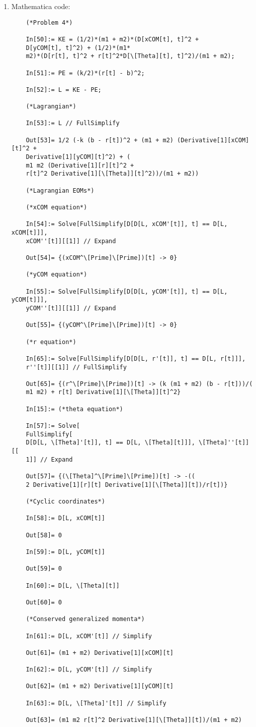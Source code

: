 \documentclass{article}
\theoremstyle{definition}
\begin{document}
\begin{enumerate}[label = (\alph*)]
	\item Mathematica code:
	\begin{lstlisting}
	(*Problem 4*)
	
	In[50]:= KE = (1/2)*(m1 + m2)*(D[xCOM[t], t]^2 + 
	D[yCOM[t], t]^2) + (1/2)*(m1*
	m2)*(D[r[t], t]^2 + r[t]^2*D[\[Theta][t], t]^2)/(m1 + m2);
	
	In[51]:= PE = (k/2)*(r[t] - b)^2;
	
	In[52]:= L = KE - PE;
	
	(*Lagrangian*)
	
	In[53]:= L // FullSimplify
	
	Out[53]= 1/2 (-k (b - r[t])^2 + (m1 + m2) (Derivative[1][xCOM][t]^2 + 
	Derivative[1][yCOM][t]^2) + (
	m1 m2 (Derivative[1][r][t]^2 + 
	r[t]^2 Derivative[1][\[Theta]][t]^2))/(m1 + m2))
	
	(*Lagrangian EOMs*)
	
	(*xCOM equation*)
	
	In[54]:= Solve[FullSimplify[D[D[L, xCOM'[t]], t] == D[L, xCOM[t]]], 
	xCOM''[t]][[1]] // Expand
	
	Out[54]= {(xCOM^\[Prime]\[Prime])[t] -> 0}
	
	(*yCOM equation*)
	
	In[55]:= Solve[FullSimplify[D[D[L, yCOM'[t]], t] == D[L, yCOM[t]]], 
	yCOM''[t]][[1]] // Expand
	
	Out[55]= {(yCOM^\[Prime]\[Prime])[t] -> 0}
	
	(*r equation*)
	
	In[65]:= Solve[FullSimplify[D[D[L, r'[t]], t] == D[L, r[t]]], 
	r''[t]][[1]] // FullSimplify
	
	Out[65]= {(r^\[Prime]\[Prime])[t] -> (k (m1 + m2) (b - r[t]))/(
	m1 m2) + r[t] Derivative[1][\[Theta]][t]^2}
	
	In[15]:= (*theta equation*)
	
	In[57]:= Solve[
	FullSimplify[
	D[D[L, \[Theta]'[t]], t] == D[L, \[Theta][t]]], \[Theta]''[t]][[
	1]] // Expand
	
	Out[57]= {(\[Theta]^\[Prime]\[Prime])[t] -> -((
	2 Derivative[1][r][t] Derivative[1][\[Theta]][t])/r[t])}
	
	(*Cyclic coordinates*)
	
	In[58]:= D[L, xCOM[t]]
	
	Out[58]= 0
	
	In[59]:= D[L, yCOM[t]]
	
	Out[59]= 0
	
	In[60]:= D[L, \[Theta][t]]
	
	Out[60]= 0
	
	(*Conserved generalized momenta*)
	
	In[61]:= D[L, xCOM'[t]] // Simplify
	
	Out[61]= (m1 + m2) Derivative[1][xCOM][t]
	
	In[62]:= D[L, yCOM'[t]] // Simplify
	
	Out[62]= (m1 + m2) Derivative[1][yCOM][t]
	
	In[63]:= D[L, \[Theta]'[t]] // Simplify
	
	Out[63]= (m1 m2 r[t]^2 Derivative[1][\[Theta]][t])/(m1 + m2)
	\end{lstlisting}
\end{enumerate}
\end{document}
